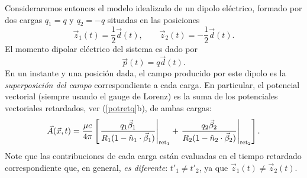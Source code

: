 Consideraremos entonces el modelo idealizado de un dipolo eléctrico, formado por dos cargas $q_1=q$ y $q_2=-q$ situadas en las posiciones
\begin{equation}
 \vec{z}_1(t)=\frac{1}{2}\vec{d}(t), \qquad \vec{z}_2(t)=-\frac{1}{2}\vec{d}(t).
\end{equation}
El momento dipolar eléctrico del sistema es dado por
\begin{equation}
 \vec{p}(t)=q\vec{d}(t).
\end{equation}
En un instante y una posición dada, el campo producido por este dipolo es la \textit{superposición del campo} correspondiente a cada carga. En particular, el potencial vectorial (siempre usando el gauge de Lorenz) es la suma de los potenciales vectoriales retardados, ver (\ref{potretq}b), de ambas cargas:
\begin{equation}
\vec{A}(\vec{x},t)=\frac{\mu c}{4\pi}\left[\left.\frac{q_1\vec{\beta}_1}{R_1(1-\hat{n}_1\cdot\vec{\beta}_1)}\right|_{{\rm ret}_1} +\left.\frac{q_2\vec{\beta}_2}{R_2(1-\hat{n}_2\cdot\vec{\beta}_2)}\right|_{{\rm ret}_2}\right].
\end{equation}
Note que las contribuciones de cada carga están evaluadas en el tiempo retardado correspondiente que, en general, \textit{es diferente}: $t'_1\neq t'_2$, ya que $\vec{z}_1(t)\neq\vec{z}_2(t)$.

